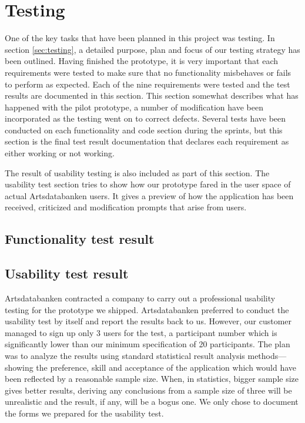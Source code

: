 \section{Testing}
\label{sec:testresult}
One of the key tasks that have been planned in this project was testing. In section \ref{sec:testing}, a detailed purpose, plan and focus of our testing strategy has been outlined. Having finished the prototype, it is very important that each requirements were tested to make sure that no functionality misbehaves or fails to perform as expected. Each of the nine requirements were tested and the test results are documented in this section. This section somewhat describes what has happened with the pilot prototype, a number of modification have been incorporated as the testing went on to correct defects. Several tests have been conducted on each functionality and code section during the sprints, but this section is the final test result documentation that declares each requirement as either working or not working.

The result of usability testing is also included as part of this section. The usability test section tries to show how our prototype fared in the user space of actual Artsdatabanken users. It gives a preview of how the application has been received, criticized and modification prompts that arise from users.

\subsection{Functionality test result}






\subsection{Usability test result}

Artsdatabanken contracted a company to carry out a professional usability testing for the prototype we shipped. Artsdatabanken preferred to conduct the usability test by itself and report the results back to us. However, our customer managed to sign up only 3 users for the test, a participant number which is significantly lower than our minimum specification of 20 participants. The plan was to analyze the results using standard statistical result analysis methods---showing the preference, skill and acceptance of the application which would have been reflected by a reasonable sample size. When, in statistics, bigger sample size gives better results\cite{statistics}, deriving any conclusions from a sample size of three will be unrealistic and the result, if any, will be a bogus one. We only chose to document the forms we prepared for the usability test.

